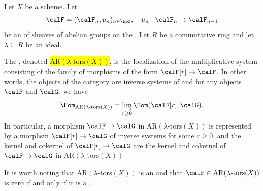 \begin{definition} \label{definition:A_R_category_of_inverse_systems_of_lambda_torsion_sheaves_on_small_etale_site}
Let $X$ be a scheme. Let 
$$\calF = (\calF_n, u_n)_{n \in \bbZ}, \quad u_n: \calF_n \to \calF_{n-1}$$
be an  of sheaves of abelian groups on the . Let $R$ be a commutative ring and let $\lambda\subseteq R$ be an ideal. 

The , denoted \hl{$\mathrm{AR}(\lambda\text{-tors}(X))$}, is the localization of the multiplicative system consisting of the family of morphisms of the form $\calF[r] \to \calF$. In other words, the objects of the category are inverse systems of  and for any objects $\calF$ and $\calG$, we have 
$$\Hom_{\mathrm{AR}(\lambda\text{-tors}(X))} = \varinjlim_{r \geq 0} \Hom(\calF[r], \calG).$$
In particular, a morphism $\calF \to \calG$ in $\mathrm{AR}(\lambda\text{-tors}(X))$ is represented by a morphsm $\calF[r] \to \calG$ of inverse systems for some $r \geq 0$, and the kernel and cokernel of $\calF[r] \to \calG$ are the kernel and cokernel of $\calF \to \calG$ in $\mathrm{AR}(\lambda\text{-tors}(X))$ 

It is worth noting that $\mathrm{AR}(\lambda\text{-tors}(X))$ is an  and that $\calF \in \mathrm{AR}(\lambda\text{-tors}(X))$ is zero if and only if it is a .
\end{definition}
